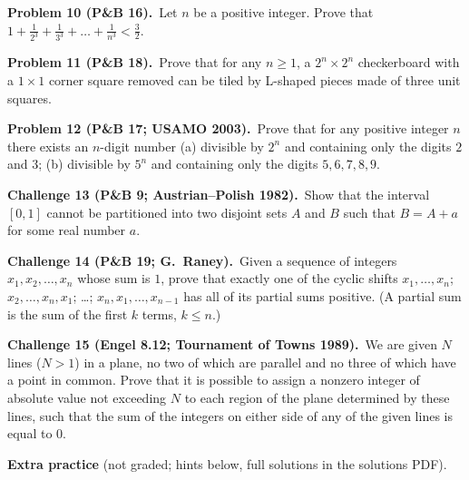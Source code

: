 \documentclass[10pt]{scrartcl}
\begin{document}
\begin{prob}\textbf{Problem 10 (P\&B 16).}\ Let $n$ be a positive integer. Prove that $1 + \frac{1}{2^3} + \frac{1}{3^3} + \dots + \frac{1}{n^3} < \frac32$.\end{prob}
\begin{prob}\textbf{Problem 11 (P\&B 18).}\ Prove that for any $n \geq 1$, a $2^n \times 2^n$ checkerboard with a $1 \times 1$ corner square removed can be tiled by L-shaped pieces made of three unit squares.\end{prob}
\begin{prob}\textbf{Problem 12 (P\&B 17; USAMO 2003).}\ Prove that for any positive integer $n$ there exists an $n$-digit number (a) divisible by $2^n$ and containing only the digits $2$ and $3$; (b) divisible by $5^n$ and containing only the digits $5, 6, 7, 8, 9$.\end{prob}
\begin{prob}\textbf{Challenge 13 (P\&B 9; Austrian--Polish 1982).}\ Show that the interval $[0, 1]$ cannot be partitioned into two disjoint sets $A$ and $B$ such that $B = A + a$ for some real number $a$.\end{prob}
\begin{prob}\textbf{Challenge 14 (P\&B 19; G.~Raney).}\ Given a sequence of integers $x_1, x_2, \dots, x_n$ whose sum is $1$, prove that exactly one of the cyclic shifts $x_1, \dots, x_n$; $x_2, \dots, x_n, x_1$; \ldots; $x_n, x_1, \dots, x_{n-1}$ has all of its partial sums positive. (A partial sum is the sum of the first $k$ terms, $k \leq n$.)\end{prob}
\begin{prob}\textbf{Challenge 15 (Engel 8.12; Tournament of Towns 1989).}\ We are given $N$ lines ($N > 1$) in a plane, no two of which are parallel and no three of which have a point in common. Prove that it is possible to assign a nonzero integer of absolute value not exceeding $N$ to each region of the plane determined by these lines, such that the sum of the integers on either side of any of the given lines is equal to $0$.\end{prob}

\medskip
\textbf{Extra practice} (not graded; hints below, full solutions in the solutions PDF).
\end{document}
